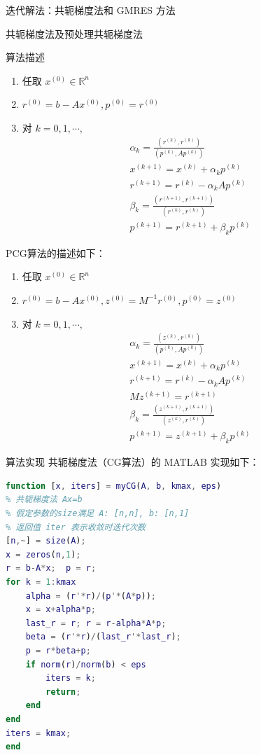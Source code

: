 \documentclass[a4paper]{article}
\begin{document}
\begin{multicols}{2}
\begin{section}{迭代解法：共轭梯度法和 GMRES 方法}
\begin{subsection}{共轭梯度法及预处理共轭梯度法}
\begin{subsubsection}{算法描述}
			\begin{enumerate}
			  \item 任取 $x^{(0)} \in \mathbb{R}^{n}$
			  \item $r^{(0)}=b-A x^{(0)}, p^{(0)}=r^{(0)}$
			  \item 对 $k=0,1,\cdots,$ $$\begin{array}{l}{\alpha_{k}=\frac{\left({r}^{(k)}, {r}^{(k)}\right)}{\left({p}^{(k)}, {A} {p}^{(k)}\right)}} \\ {{x}^{(k+1)}={x}^{(k)}+{\alpha}_{k} {p}^{(k)}} \\ {{r}^{(k+1)}={r}^{(k)}-{\alpha}_{k} {A} {p}^{(k)}} \\ {{\beta}_{k}=\frac{\left({r}^{(k+1)}, {r}^{(k+1)}\right)}{\left({r}^{(k)}, {r}^{(k)}\right)}} \\ {{p}^{(k+1)}={r}^{(k+1)}+{\beta}_{k} {p}^{(k)}}\end{array}$$
			\end{enumerate}
			
			PCG算法的描述如下：
			
			\begin{enumerate}
			  \item 任取 $x^{(0)} \in \mathbb{R}^{n}$
			  \item $r^{(0)}=b-A x^{(0)}, z^{(0)}=M^{-1} r^{(0)}, p^{(0)}=z^{(0)}$
			  \item 对 $k=0,1,\cdots,$ $$\begin{array}{l}{\alpha_{k}=\frac{\left(z^{(k)}, r^{(k)}\right)}{\left(p^{(k)}, A p^{(k)}\right)}} \\ {x^{(k+1)}=x^{(k)}+\alpha_{k} p^{(k)}} \\ {r^{(k+1)}=r^{(k)}-\alpha_{k} A p^{(k)}} \\ {M z^{(k+1)}=r^{(k+1)}}  \\ {\beta_{k}=\frac{\left(z^{(k+1)}, r^{(k+1)}\right)}{\left(z^{(k)}, r^{(k)}\right)}} \\ {p^{(k+1)}=z^{(k+1)}+\beta_{k} p^{(k)}}\end{array}$$
			\end{enumerate}
			
		\end{subsubsection}
	
		\begin{subsubsection}{算法实现}
			共轭梯度法（CG算法）的 MATLAB 实现如下：
			
			\begin{lstlisting}[language=Matlab]
function [x, iters] = myCG(A, b, kmax, eps)
% 共轭梯度法 Ax=b
% 假定参数的size满足 A: [n,n], b: [n,1]
% 返回值 iter 表示收敛时迭代次数
[n,~] = size(A);
x = zeros(n,1);
r = b-A*x;  p = r;
for k = 1:kmax
    alpha = (r'*r)/(p'*(A*p));
    x = x+alpha*p;
    last_r = r; r = r-alpha*A*p;
    beta = (r'*r)/(last_r'*last_r);
    p = r*beta+p;
    if norm(r)/norm(b) < eps
        iters = k;
        return;
    end
end
iters = kmax;
end
			\end{lstlisting}
			

\end{subsubsection}
\end{subsection}
\end{section}
\end{multicols}
\end{document}
